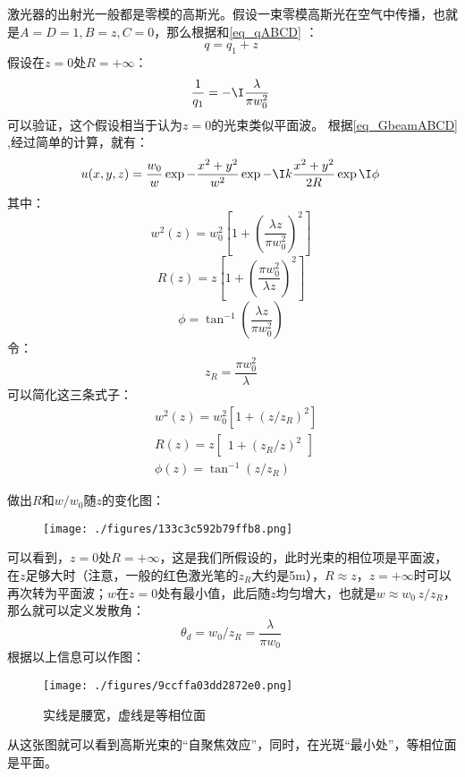 激光器的出射光一般都是零模的高斯光。假设一束零模高斯光在空气中传播，也就是$A=D=1,B=z,C=0$，那么根据和\autoref{eq_qABCD} ：
\begin{equation}
q=q_1+z~
\end{equation}
假设在$z=0$处$R=+\infty$：
\begin{equation}
\frac{1}{q_1}=-\I \frac{\lambda}{\pi w_0^2}~
\end{equation}
可以验证，这个假设相当于认为$z=0$的光束类似平面波。
根据\autoref{eq_GbeamABCD} ,经过简单的计算，就有：%
\begin{equation}
u(x,y,z)=\frac{w_0}{w}\exp-\frac{x^2+y^2}{w^2}\exp-\I k\frac{x^2+y^2}{2R}\exp \I\phi ~
\end{equation}
其中：
\begin{equation}
w^2(z)=w_0^2\left[1+\left(\frac{\lambda z}{\pi w_0^2}\right)^2\right]~
\end{equation}
\begin{equation}
R(z)=z\left[1+\left(\frac{\pi w_0^2}{\lambda z}\right)^2\right]~
\end{equation}
\begin{equation}
\phi=\tan^{-1}\left(\frac{\lambda z}{\pi w_0^2}\right)~
\end{equation}
令：
\begin{equation}
z_R=\frac{\pi w_0^2}{\lambda}~
\end{equation}
可以简化这三条式子：
\begin{equation}
\begin{aligned}
&w^{2}(z) =w_{0}^{2}\left[1+(z/z_{R})^{2}\right] \\
&R(z) =z\begin{bmatrix}1+(z_R/z)^2\end{bmatrix} \\
&\phi(z) =\tan^{-1} (z/z_{R}) ~
\end{aligned}~
\end{equation}

做出$R$和$w/w_0$随$z$的变化图：
\begin{figure}[ht]
\centering
\texttt{[image: ./figures/133c3c592b79ffb8.png]}
\caption{} \label{fig_GBeam_12}
\end{figure}

可以看到，$z=0$处$R=+\infty$，这是我们所假设的，此时光束的相位项是平面波，在$z$足够大时（注意，一般的红色激光笔的$z_R$大约是5m），$R\approx z$，$z=+\infty$时可以再次转为平面波；$w$在$z=0$处有最小值，此后随$z$均匀增大，也就是$w\approx w_0 \,z/z_R$，那么就可以定义发散角：
\begin{equation}
\theta_d=w_0/z_R=\frac{\lambda}{\pi w_0}~
\end{equation}
根据以上信息可以作图：
\begin{figure}[ht]
\centering
\texttt{[image: ./figures/9ccffa03dd2872e0.png]}
\caption{实线是腰宽，虚线是等相位面} \label{fig_GBeam_13}
\end{figure}
从这张图就可以看到高斯光束的“自聚焦效应”，同时，在光斑“最小处”，等相位面是平面。

